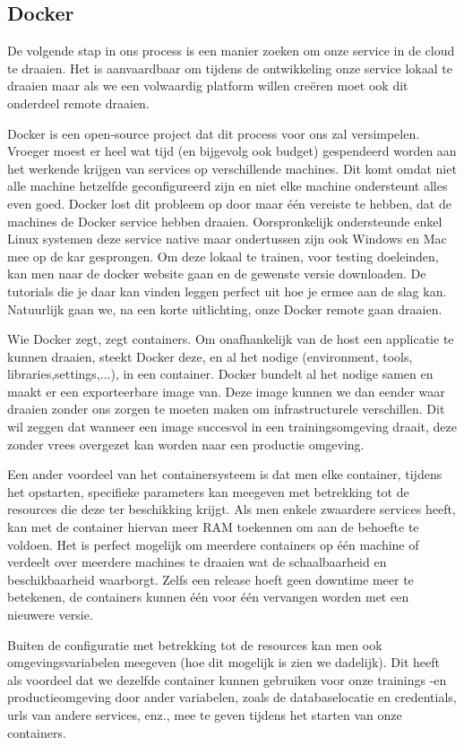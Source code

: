 	\subsection{Docker}
	De volgende stap in ons process is een manier zoeken om onze service in de cloud te draaien. Het is aanvaardbaar om tijdens de ontwikkeling onze service lokaal te draaien maar als we een volwaardig platform willen cre\"eren moet ook dit onderdeel remote draaien.
	\par	
	Docker is een open-source project dat dit process voor ons zal versimpelen. 
    Vroeger moest er heel wat tijd (en bijgevolg ook budget) gespendeerd worden aan het werkende krijgen van services op verschillende machines. 
    Dit komt omdat niet alle machine hetzelfde geconfigureerd zijn en niet elke machine ondersteunt alles even goed. 
    Docker lost dit probleem op door maar \'e\'en vereiste te hebben, dat de machines de Docker service hebben draaien. Oorspronkelijk ondersteunde enkel Linux systemen deze service native maar ondertussen zijn ook Windows en Mac mee op de kar gesprongen. Om deze lokaal te trainen, voor testing doeleinden, kan men naar de docker website gaan en de gewenste versie downloaden. De tutorials die je daar kan vinden leggen perfect uit hoe je ermee aan de slag kan. Natuurlijk gaan we, na een korte uitlichting, onze Docker remote gaan draaien.
	\par
	Wie Docker zegt, zegt containers. Om onafhankelijk van de host een applicatie te kunnen draaien, steekt Docker deze, en al het nodige (environment, tools, libraries,settings,...), in een container. Docker bundelt al het nodige samen en maakt er een exporteerbare image van. Deze image kunnen we dan eender waar draaien zonder ons zorgen te moeten maken om infrastructurele verschillen. Dit wil zeggen dat wanneer een image succesvol in een trainingsomgeving draait, deze zonder vrees overgezet kan worden naar een productie omgeving.
	\par
	Een ander voordeel van het containersysteem is dat men elke container, tijdens het opstarten, specifieke parameters kan meegeven met betrekking tot de resources die deze ter beschikking krijgt. Als men enkele zwaardere services heeft, kan met de container hiervan meer RAM toekennen om aan de behoefte te voldoen. Het is perfect mogelijk om meerdere containers op \'e\'en machine of verdeelt over meerdere machines te draaien wat de schaalbaarheid en beschikbaarheid waarborgt. Zelfs een release hoeft geen downtime meer te betekenen, de containers kunnen \'e\'en voor \'e\'en vervangen worden met een nieuwere versie.
	\par
	Buiten de configuratie met betrekking tot de resources kan men ook omgevingsvariabelen meegeven (hoe dit mogelijk is zien we dadelijk). Dit heeft als voordeel dat we dezelfde container kunnen gebruiken voor onze trainings -en productieomgeving door ander variabelen, zoals de databaselocatie en credentials, urls van andere services, enz., mee te geven tijdens het starten van onze containers.
